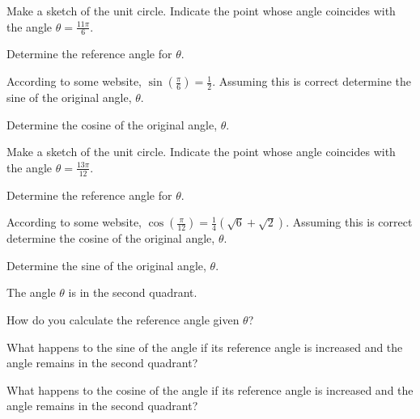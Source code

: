 \begin{problem}
\item Make a sketch of the unit circle. Indicate the point whose angle
  coincides with the angle $\theta=\frac{11\pi}{6}$.
  \begin{subproblem}
    \item Determine the reference angle for $\theta$.
      \vfill
    \item According to some website,
    $\displaystyle{\sin\left(\frac{\pi}{6}\right)=\frac{1}{2}}$.
    Assuming this is correct determine the sine of the original angle,
    $\theta$.
      \vfill
    \item Determine the cosine of the original angle, $\theta$.
      \vfill
  \end{subproblem}

  \clearpage

  \item Make a sketch of the unit circle. Indicate the point whose angle
    coincides with the angle $\theta=\frac{13\pi}{12}$.
    \begin{subproblem}
      \item Determine the reference angle for $\theta$.
        \vfill
      \item According to some website,
      $\displaystyle{\cos\left(\frac{\pi}{12}\right)=\frac{1}{4}\left( \sqrt{6} + \sqrt{2}\right)}$.
      Assuming this is correct determine the cosine of the original
      angle, $\theta$.
        \vfill
      \item Determine the sine of the original angle, $\theta$.
        \vfill
    \end{subproblem}

    \clearpage

  \item The angle $\theta$ is in the second quadrant.
  \begin{subproblem}
    \item How do you calculate the reference angle given $\theta$?
      \vfill
    \item What happens to the sine of the angle if its reference angle is
      increased and the angle remains in the second quadrant?
      \vfill
    \item What happens to the cosine of the angle if its reference angle is
      increased and the angle remains in the second quadrant?
      \vfill
  \end{subproblem}


\end{problem}
